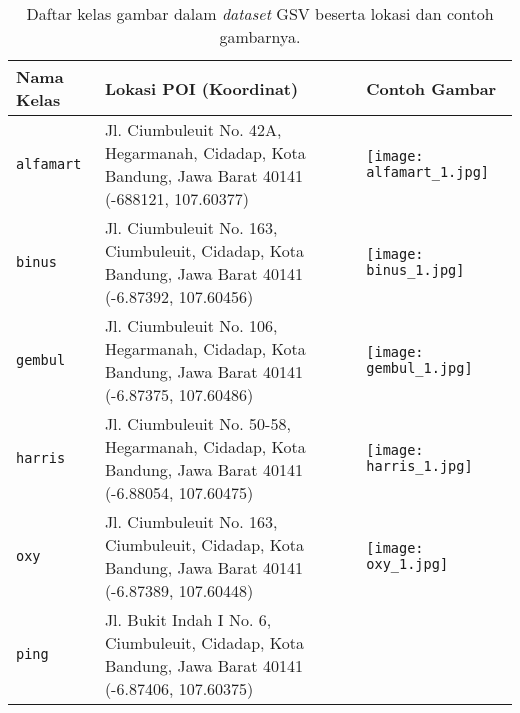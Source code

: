 \begin{longtable}{|p{}|p{}|p{}|}
	\caption{Daftar kelas gambar dalam \textit{dataset} GSV beserta lokasi dan contoh gambarnya.}
	\label{tab:contoh_dataset_gsv} \\
	\hline
	\textbf{Nama Kelas} & \textbf{Lokasi POI (Koordinat)} & \textbf{Contoh Gambar} \\
	\hline
	\texttt{alfamart} & Jl. Ciumbuleuit No. 42A, Hegarmanah, Cidadap, Kota Bandung, Jawa Barat 40141 (-688121, 107.60377) & \begin{minipage}{.4\textwidth}
		\vspace{5pt} \texttt{[image: alfamart\_1.jpg]}
	\end{minipage} \\
	\hline
	\texttt{binus} & Jl. Ciumbuleuit No. 163, Ciumbuleuit, Cidadap, Kota Bandung, Jawa Barat 40141 (-6.87392, 107.60456) & \begin{minipage}{.4\textwidth}
		\vspace{5pt} \texttt{[image: binus\_1.jpg]}
	\end{minipage} \\
	\hline
	\texttt{gembul} & Jl. Ciumbuleuit No. 106, Hegarmanah, Cidadap, Kota Bandung, Jawa Barat 40141 (-6.87375, 107.60486) & \begin{minipage}{.4\textwidth}
		\vspace{5pt} \texttt{[image: gembul\_1.jpg]}
	\end{minipage} \\
	\hline
	\texttt{harris} & Jl. Ciumbuleuit No. 50-58, Hegarmanah, Cidadap, Kota Bandung, Jawa Barat 40141 (-6.88054, 107.60475) & \begin{minipage}{.4\textwidth}
		\vspace{5pt} \texttt{[image: harris\_1.jpg]}
	\end{minipage} \\
	\hline
	\texttt{oxy} & Jl. Ciumbuleuit No. 163, Ciumbuleuit, Cidadap, Kota Bandung, Jawa Barat 40141 (-6.87389, 107.60448) & \begin{minipage}{.4\textwidth}
		\vspace{5pt} \texttt{[image: oxy\_1.jpg]}
	\end{minipage} \\
	\hline
	\texttt{ping} & Jl. Bukit Indah I No. 6, Ciumbuleuit, Cidadap, Kota Bandung, Jawa Barat 40141 (-6.87406, 107.60375) & \begin{minipage}{.4\textwidth}

\end{minipage}
\end{longtable}
